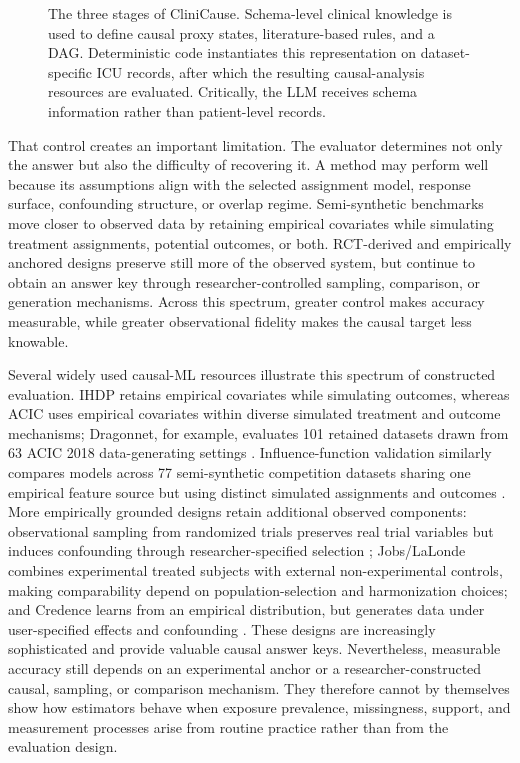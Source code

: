 \documentclass[letterpaper]{article}
\begin{document}
\begin{figure}[t]

\caption{The three stages of CliniCause. Schema-level clinical knowledge is
used to define causal proxy states, literature-based rules, and a DAG.
Deterministic code instantiates this representation on dataset-specific ICU
records, after which the resulting causal-analysis resources are evaluated.
Critically, the LLM receives schema information rather than patient-level records.}
\label{fig:pipeline}
\end{figure}



That control creates an important limitation. The evaluator determines not only
the answer but also the difficulty of recovering it. A method may perform well
because its assumptions align with the selected assignment model, response
surface, confounding structure, or overlap regime. Semi-synthetic benchmarks
move closer to observed data by retaining empirical covariates while simulating
treatment assignments, potential outcomes, or both. RCT-derived and
empirically anchored designs preserve still more of the observed system, but
continue to obtain an answer key through researcher-controlled sampling,
comparison, or generation mechanisms. Across this spectrum, greater control
makes accuracy measurable, while greater observational fidelity makes the
causal target less knowable.


Several widely used causal-ML resources illustrate this spectrum of constructed
evaluation. IHDP retains empirical covariates while simulating outcomes, whereas
ACIC uses empirical covariates within diverse simulated treatment and outcome
mechanisms; Dragonnet, for example, evaluates 101 retained datasets drawn from
63 ACIC 2018 data-generating settings
\cite{shalit2017ite,shi2019dragonnet}. Influence-function validation similarly
compares models across 77 semi-synthetic competition datasets sharing one
empirical feature source but using distinct simulated assignments and outcomes
\cite{alaa2019validating}. More empirically grounded designs retain additional
observed components: observational sampling from randomized trials preserves
real trial variables but induces confounding through researcher-specified
selection \cite{gentzel2021experimental}; Jobs/LaLonde combines experimental
treated subjects with external non-experimental controls, making comparability
depend on population-selection and harmonization choices; and Credence learns
from an empirical distribution, but generates data under user-specified effects
and confounding \cite{parikh2022validating}. These designs are increasingly
sophisticated and provide valuable causal answer keys. Nevertheless, measurable
accuracy still depends on an experimental anchor or a researcher-constructed
causal, sampling, or comparison mechanism. They therefore cannot by themselves
show how estimators behave when exposure prevalence, missingness, support, and measurement processes arise from routine practice rather than from the
evaluation design.
\end{document}
